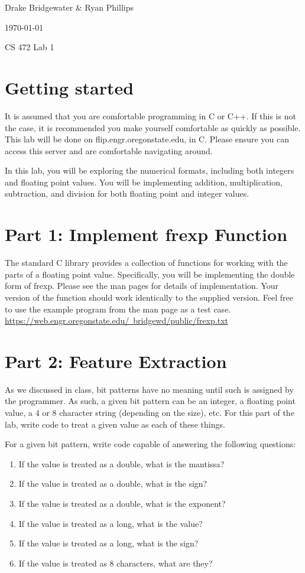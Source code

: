 \documentclass[letterpaper,12pt,titlepage]{article}
\def\name{Drake Bridgewater \& Ryan Phillips}
\begin{document}
\hfill \name

\hfill \today

\hfill CS 472 Lab 1
\section*{Getting started}
It is assumed that you are comfortable programming in C or C++. If this is not the case, it is recommended you make yourself comfortable as quickly as possible. This lab will be done on flip.engr.oregonstate.edu, in C. Please ensure you can access this server and are comfortable navigating around.

In this lab, you will be exploring the numerical formats, including both integers and floating point values. You will be implementing addition, multiplication, subtraction, and division for both floating point and integer values.

\section*{Part 1: Implement frexp Function}
The standard C library provides a collection of functions for working with the parts of a floating point value. Specifically, you will be implementing the double form of frexp. Please see the man pages for details of implementation. Your version of the function should work identically to the supplied version. Feel free to use the example program from the man page as a test case.  \hyperref[frexp]{https://web.engr.oregonstate.edu/~bridgewd/public/frexp.txt}
\section*{Part 2: Feature Extraction}
As we discussed in class, bit patterns have no meaning until such is assigned by the programmer. As such, a given bit pattern can be an integer, a floating point value, a 4 or 8 character string (depending on the size), etc. For this part of the lab, write code to treat a given value as each of these things.

For a given bit pattern, write code capable of answering the following questions:
\begin{enumerate}
\item[]If the value is treated as a double, what is the mantissa?

\item[]If the value is treated as a double, what is the sign?

\item[]If the value is treated as a double, what is the exponent?

\item[]If the value is treated as a long, what is the value?

\item[]If the value is treated as a long, what is the sign?

\item[]If the value is treated as 8 characters, what are they?

\end{enumerate}

\begin{thebibliography}{9}


\end{thebibliography}
\end{document}
